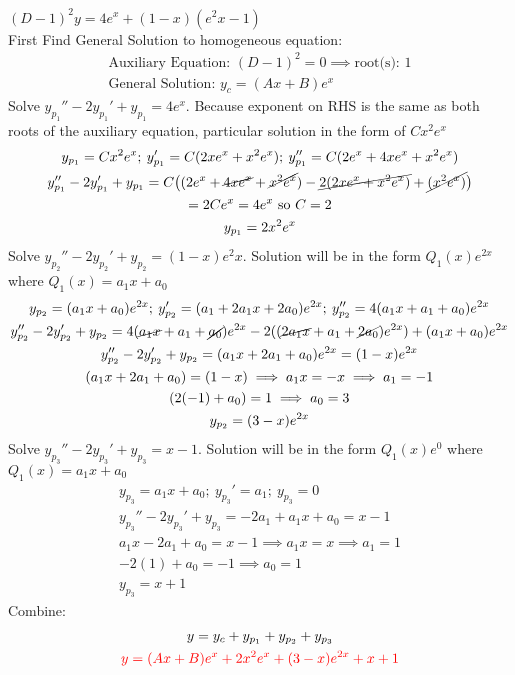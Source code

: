 \item [37.] $(D-1)^2y=4e^x+(1-x)(e^2x-1)$\\[2mm]
First Find General Solution to homogeneous equation:
\begin{gather*}
    \text{Auxiliary Equation: } (D-1)^2=0
    \implies \text{root(s): } 1\\
    \text{General Solution: } y_c=(Ax+B)e^x
\end{gather*}
Solve $y_{p_1}''-2y_{p_1}'+y_{p_1}=4e^x$. Because exponent on RHS is the same as both roots of the auxiliary equation, particular solution in the form of $Cx^2e^{x}$
\begin{gather*}
    y_{p_1}=Cx^2e^{x};\:y_{p_1}'=C(2xe^{x}+x^2e^{x});\:y_{p_1}''=C(2e^{x}+4xe^{x}+x^2e^{x})\\
    y_{p_1}''-2y_{p_1}'+y_{p_1}=C\big(
        (2e^{x}+\cancel{4xe^{x}}+\cancel{x^2e^{x}})
        -\cancel{2(2xe^{x}+x^2e^{x})}
        +\cancel{(x^2e^{x})}
    \big)\\
    =2Ce^{x} = 4e^{x} \text{ so } C=2\\
    y_{p_1} = 2x^2e^{x}
\end{gather*}
Solve $y_{p_2}''-2y_{p_2}'+y_{p_2}=(1-x)e^2x$. Solution will be in the form $Q_1(x)e^{2x}$ where $Q_1(x)=a_1x+a_0$
\begin{gather*}
    y_{p_2}=(a_1x+a_0)e^{2x};\:y_{p_2}'=(a_1+2a_1x+2a_0)e^{2x};\:y_{p_2}''=4(a_1x+a_1+a_0)e^{2x}\\
    y_{p_2}''-2y_{p_2}'+y_{p_2}=
    4(\cancel{a_1x}+a_1+\cancel{a_0})e^{2x}
    -2((\cancel{2a_1x}+a_1+\cancel{2a_0})e^{2x})
    +(a_1x+a_0)e^{2x}\\
    y_{p_2}''-2y_{p_2}'+y_{p_2}=(a_1x+2a_1+a_0)e^{2x}=(1-x)e^{2x}\\
    (a_1x+2a_1+a_0)=(1-x) \implies a_1x=-x \implies a_1 = -1\\
    (2(-1)+a_0)=1 \implies a_0=3\\
    y_{p_2}=(3-x)e^{2x}
\end{gather*}
Solve $y_{p_3}''-2y_{p_3}'+y_{p_3}=x-1$. Solution will be in the form $Q_1(x)e^{0}$ where $Q_1(x)=a_1x+a_0$
\begin{gather*}
    y_{p_3}=a_1x+a_0;\:y_{p_3}'=a_1;\:y_{p_3}=0\\
    y_{p_3}''-2y_{p_3}'+y_{p_3}=-2a_1+a_1x+a_0=x-1\\
    a_1x-2a_1+a_0=x-1 \implies a_1x=x \implies a_1 = 1\\
    -2(1)+a_0=-1 \implies a_0=1\\
    y_{p_3}=x+1
\end{gather*}
Combine:
\begin{gather*}
    y = y_c+y_{p_1}+y_{p_2}+y_{p_3}\\
    \textcolor{red}{y = (Ax+B)e^x
    +2x^2e^{x}
    +(3-x)e^{2x}
    +x+1}
\end{gather*}
